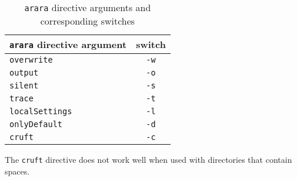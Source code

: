 	\begin{table}[!ht]
		\centering
		\caption{\texttt{arara} directive arguments and corresponding switches}
		\label{tab:orbsandswitches}
		\begin{tabular}{lc}
			\toprule
			\texttt{arara} directive argument & switch      \\
			\midrule
			\texttt{overwrite}                & \texttt{-w} \\
			\texttt{output}                   & \texttt{-o} \\
			\texttt{silent}                   & \texttt{-s} \\
			\texttt{trace}                    & \texttt{-t} \\
			\texttt{localSettings}            & \texttt{-l} \\
			\texttt{onlyDefault}              & \texttt{-d} \\
			\texttt{cruft}                    & \texttt{-c} \\
			\bottomrule
		\end{tabular}
	\end{table}

	The \texttt{cruft} directive does not work well when used with directories that contain spaces.

